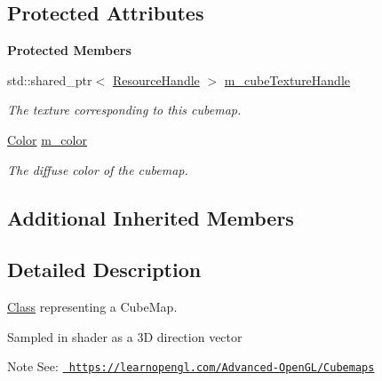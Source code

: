 \subsection*{Protected Attributes}
\begin{Indent}\textbf{ Protected Members}\par
\begin{DoxyCompactItemize}
\item 
\mbox{\label{classrev_1_1_cube_map_component_a949e692068c92b65b241546047904e89}} 
std\+::shared\+\_\+ptr$<$ \mbox{\hyperlink{classrev_1_1_resource_handle}{Resource\+Handle}} $>$ \mbox{\hyperlink{classrev_1_1_cube_map_component_a949e692068c92b65b241546047904e89}{m\+\_\+cube\+Texture\+Handle}}
\begin{DoxyCompactList}\small\item\em The texture corresponding to this cubemap. \end{DoxyCompactList}\item 
\mbox{\label{classrev_1_1_cube_map_component_a57eaee9f14afa2d3e1a46949864be9f0}} 
\mbox{\hyperlink{classrev_1_1_color}{Color}} \mbox{\hyperlink{classrev_1_1_cube_map_component_a57eaee9f14afa2d3e1a46949864be9f0}{m\+\_\+color}}
\begin{DoxyCompactList}\small\item\em The diffuse color of the cubemap. \end{DoxyCompactList}\end{DoxyCompactItemize}
\end{Indent}
\subsection*{Additional Inherited Members}


\subsection{Detailed Description}
\mbox{\hyperlink{struct_class}{Class}} representing a Cube\+Map. 

Sampled in shader as a 3D direction vector \begin{DoxyNote}{Note}
See\+: \href{https://learnopengl.com/Advanced-OpenGL/Cubemaps}{\texttt{ https\+://learnopengl.\+com/\+Advanced-\/\+Open\+G\+L/\+Cubemaps}} 
\end{DoxyNote}


